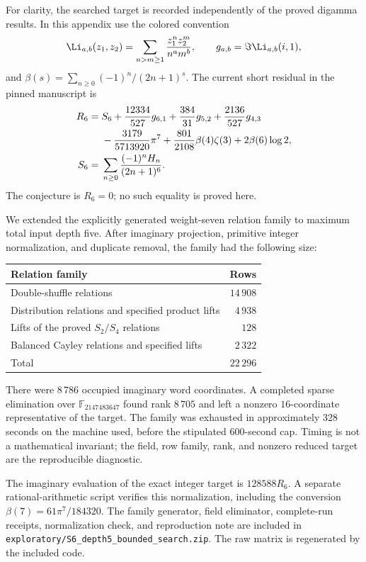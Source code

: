 For clarity, the searched target is recorded independently of the
proved digamma results.  In this appendix use the colored convention
\[
 \Li_{a,b}(z_1,z_2)=
       \sum_{n>m\ge1}\frac{z_1^nz_2^m}{n^am^b},\qquad
 g_{a,b}=\Im\Li_{a,b}(i,1),
\]
and $\beta(s)=\sum_{n\ge0}(-1)^n/(2n+1)^s$.
The current short residual in the pinned manuscript is
\begin{align}
 R_6={}&S_6+\frac{12334}{527}g_{6,1}
          +\frac{384}{31}g_{5,2}+\frac{2136}{527}g_{4,3}
 \notag\\
 &-\frac{3179}{5713920}\pi^7
     +\frac{801}{2108}\beta(4)\zeta(3)+2\beta(6)\log2,
 \label{eq:S6residual}\\
 S_6={}&\sum_{n\ge0}\frac{(-1)^nH_n}{(2n+1)^6}.
 \notag
\end{align}
The conjecture is $R_6=0$; no such equality is proved here.

We extended the explicitly generated weight-seven relation family
to maximum total input depth five.  After imaginary projection,
primitive integer normalization, and duplicate removal, the family
had the following size:
\begin{center}
\begin{tabular}{lr}
\toprule
Relation family & Rows\\
\midrule
Double-shuffle relations & $14\,908$\\
Distribution relations and specified product lifts & $4\,938$\\
Lifts of the proved $S_2/S_4$ relations & $128$\\
Balanced Cayley relations and specified lifts & $2\,322$\\
\midrule
Total & $22\,296$\\
\bottomrule
\end{tabular}
\end{center}
There were $8\,786$ occupied imaginary word coordinates.  A completed
sparse elimination over $\mathbb F_{2147483647}$ found rank
$8\,705$ and left a nonzero $16$-coordinate representative of the
target.  The family was exhausted in approximately $328$ seconds
on the machine used, before the stipulated $600$-second cap.
Timing is not a mathematical invariant; the field, row family,
rank, and nonzero reduced target are the reproducible diagnostic.

The imaginary evaluation of the exact integer target is $128588R_6$.
A separate rational-arithmetic script verifies this normalization,
including the conversion $\beta(7)=61\pi^7/184320$.
The family generator, field eliminator, complete-run receipts,
normalization check, and reproduction note are included in
\texttt{exploratory/S6\_depth5\_bounded\_search.zip}.
The raw matrix is regenerated by the included code.

